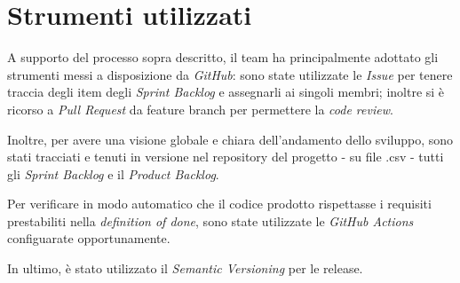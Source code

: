 \section{Strumenti utilizzati}\label{sec:strumenti-utilizzati}
A supporto del processo sopra descritto, il team ha principalmente adottato gli strumenti messi a disposizione da \textit{GitHub}: sono state utilizzate le \textit{Issue} per
tenere traccia degli item degli \textit{Sprint Backlog} e assegnarli ai singoli membri;
inoltre si è ricorso a \textit{Pull Request} da feature branch per permettere la \textit{code review}.

Inoltre, per avere una visione globale e chiara dell'andamento dello sviluppo, sono stati tracciati e tenuti in versione nel repository del progetto - su file .csv - tutti gli \textit{Sprint Backlog} e il \textit{Product Backlog}.

Per verificare in modo automatico che il codice prodotto rispettasse i requisiti prestabiliti nella \textit{definition of done}, sono state utilizzate le \textit{GitHub Actions} configuarate opportunamente.

In ultimo, è stato utilizzato il \textit{Semantic Versioning}  per le release.
